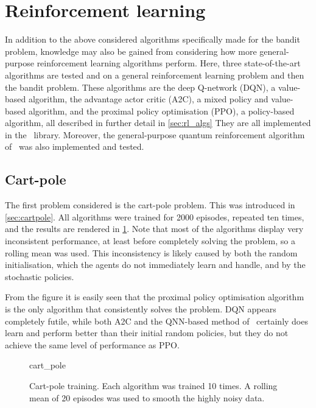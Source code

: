 \section{Reinforcement learning}
\label{sec:sim_rl}

In addition to the above considered algorithms specifically made for the bandit problem, knowledge may also be gained from considering how more general-purpose reinforcement learning algorithms perform.
Here, three state-of-the-art algorithms are tested and on a general reinforcement learning problem and then the bandit problem.
These algorithms are the deep Q-network (DQN), a value-based algorithm, the advantage actor critic (A2C), a mixed policy and value-based algorithm, and the proximal policy optimisation (PPO), a policy-based algorithm, all described in further detail in \cref{sec:rl_algs}
They are all implemented in the~\autocite{sb3} library.
Moreover, the general-purpose quantum reinforcement algorithm of~\autocite{jerbi2021} was also implemented and tested.

\subsection{Cart-pole}
\label{sec:sim_rl_cartpole}

The first problem considered is the cart-pole problem.
This was introduced in \cref{sec:cartpole}.
All algorithms were trained for 2000 episodes, repeated ten times, and the results are rendered in \cref{fig:cartpole_training}.
Note that most of the algorithms display very inconsistent performance, at least before completely solving the problem, so a rolling mean was used.
This inconsistency is likely caused by both the random initialisation, which the agents do not immediately learn and handle, and by the stochastic policies.

From the figure it is easily seen that the proximal policy optimisation algorithm is the only algorithm that consistently solves the problem.
DQN appears completely futile, while both A2C and the QNN-based method of~\autocite{jerbi2021} certainly does learn and perform better than their initial random policies, but they do not achieve the same level of performance as PPO.


\begin{figure}
    \centering
    \newcommand{\myoptions}{
        width=10cm,
        height=8cm,
        xlabel={Episode},
        ylabel={Sum of rewards},
        legend cell align=left,
        mystyle,
        legend entries={A2C, DQN, PPO, QNN},
    }
    {cart_pole}
    \caption[
        Cart-pole training.
    ]
    {
        Cart-pole training.
        Each algorithm was trained 10 times.
        A rolling mean of 20 episodes was used to smooth the highly noisy data.
    }
    \label{fig:cartpole_training}
\end{figure}

